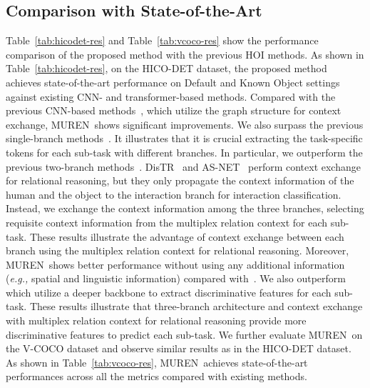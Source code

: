 \documentclass[10pt,twocolumn,letterpaper]{article}
\begin{document}
\subsection{Comparison with State-of-the-Art}
Table~\ref{tab:hicodet-res} and Table~\ref{tab:vcoco-res} show the performance comparison of the proposed method with the previous HOI methods.
As shown in Table~\ref{tab:hicodet-res}, on the HICO-DET dataset, the proposed method achieves state-of-the-art performance on Default and Known Object settings against existing CNN- and transformer-based methods.
Compared with the previous CNN-based methods~\cite{zhang2021spatially,qi2018dpnn,gao2020drg,ulutan2020vsgnet,wang2020hetero}, which utilize the graph structure for context exchange, MUREN~shows significant improvements.
We also surpass the previous single-branch methods~\cite{zou2021hoitrans,kim2022mstr,tamura2021qpic}.
It illustrates that it is crucial extracting the task-specific tokens for each sub-task with different branches.
In particular, we outperform the previous two-branch methods~\cite{zhang2022upt,zhang2021cdn,zhou2022distr,chen2021asnet,kim2021hotr}.
DisTR~\cite{zhou2022distr} and AS-NET~\cite{chen2021asnet} perform context exchange for relational reasoning, but they only propagate the context information of the human and the object to the interaction branch for interaction classification.
Instead, we exchange the context information among the three branches, selecting requisite context information from the multiplex relation context for each sub-task.
These results illustrate the advantage of context exchange between each branch using the multiplex relation context for relational reasoning.
Moreover, MUREN~shows better performance without using any additional information (\textit{e.g.,} spatial and linguistic information) compared with~\cite{kim2022mstr,zhang2022stip,zhang2022upt,zhang2021spatially}.
We also outperform~\cite{zhang2021cdn,tamura2021qpic,zou2021hoitrans} which utilize a deeper backbone to extract discriminative features for each sub-task.
These results illustrate that three-branch architecture and context exchange with multiplex relation context for relational reasoning provide more discriminative features to predict each sub-task.
We further evaluate MUREN~on the V-COCO dataset and observe similar results as in the HICO-DET dataset.
As shown in Table~\ref{tab:vcoco-res}, MUREN~achieves state-of-the-art performances across all the metrics compared with existing methods.
\end{document}
